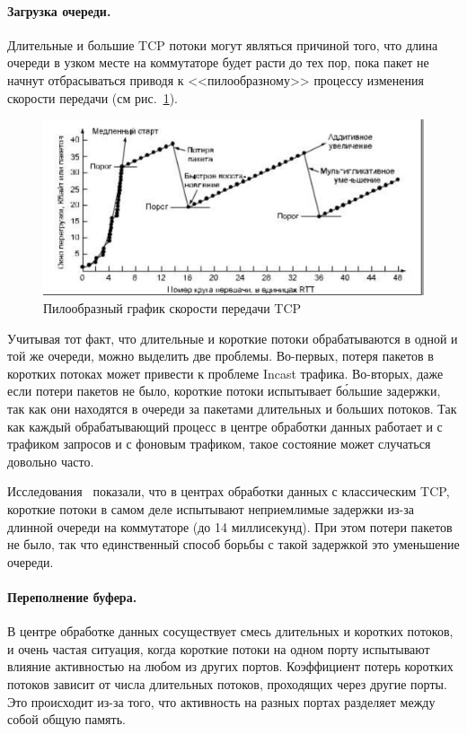 \documentclass[14pt, a4paper,oneside]{extarticle}
\begin{document}
\paragraph{Загрузка очереди.}
Длительные и большие TCP потоки могут являться причиной того, что длина очереди в узком месте на коммутаторе будет расти до тех пор, пока пакет не начнут отбрасываться приводя к <<пилообразному>> процессу изменения скорости передачи (см рис.~\ref{tcp_sawtooth}).
\begin{figure}
	\includegraphics[width=0.7\linewidth]{tcp_sawtooth.jpg}
	\caption{Пилообразный график скорости передачи TCP}
	\label{tcp_sawtooth}
\end{figure}
Учитывая тот факт, что длительные и короткие потоки обрабатываются в одной и той же очереди, можно выделить две проблемы. Во-первых, потеря пакетов в коротких потоках может привести к проблеме Incast трафика. Во-вторых, даже если потери пакетов не было, короткие потоки испытывает б\'{о}льшие задержки, так как они находятся в очереди за пакетами длительных и больших потоков. Так как каждый обрабатывающий процесс в центре обработки данных работает и с трафиком запросов и с фоновым трафиком, такое состояние может случаться довольно часто.

Исследования~\cite{dctcp} показали, что в центрах обработки данных с классическим TCP, короткие потоки в самом деле испытывают неприемлимые задержки из-за длинной очереди на коммутаторе (до 14 миллисекунд). При этом потери пакетов не было, так что единственный способ борьбы с такой задержкой  это уменьшение очереди.

\paragraph{Переполнение буфера.}
В центре обработке данных сосуществует смесь длительных и коротких потоков, и очень частая ситуация, когда короткие потоки на одном порту испытывают влияние активностью на любом из других портов. Коэффициент потерь коротких потоков зависит от числа длительных потоков, проходящих через другие порты. Это происходит из-за того, что активность на разных портах разделяет между собой общую память.
\end{document}
